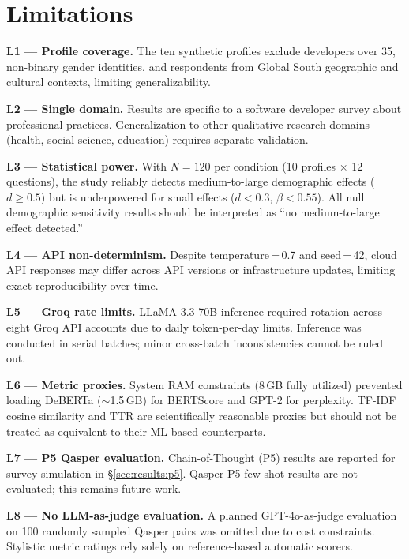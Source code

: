 \documentclass[sigconf,nonacm]{acmart}
\begin{document}
\section{Limitations}
\label{sec:limitations}

\textbf{L1 --- Profile coverage.}
The ten synthetic profiles exclude developers over 35, non-binary gender
identities, and respondents from Global South geographic and cultural
contexts, limiting generalizability.

\textbf{L2 --- Single domain.}
Results are specific to a software developer survey about professional
practices. Generalization to other qualitative research domains
(health, social science, education) requires separate validation.

\textbf{L3 --- Statistical power.}
With $N{=}120$ per condition (10 profiles $\times$ 12 questions), the
study reliably detects medium-to-large demographic effects ($d \geq 0.5$)
but is underpowered for small effects ($d < 0.3$, $\beta < 0.55$).
All null demographic sensitivity results should be interpreted as
``no medium-to-large effect detected.''

\textbf{L4 --- API non-determinism.}
Despite temperature\,=\,0.7 and seed\,=\,42, cloud API responses may
differ across API versions or infrastructure updates, limiting exact
reproducibility over time.

\textbf{L5 --- Groq rate limits.}
LLaMA-3.3-70B inference required rotation across eight Groq API accounts
due to daily token-per-day limits. Inference was conducted in serial
batches; minor cross-batch inconsistencies cannot be ruled out.

\textbf{L6 --- Metric proxies.}
System RAM constraints (8\,GB fully utilized) prevented loading DeBERTa
($\sim$1.5\,GB) for BERTScore and GPT-2 for perplexity. TF-IDF cosine
similarity and TTR are scientifically reasonable proxies but should not
be treated as equivalent to their ML-based counterparts.

\textbf{L7 --- P5 Qasper evaluation.}
Chain-of-Thought (P5) results are reported for survey simulation in
\S\ref{sec:results:p5}. Qasper P5 few-shot results are not evaluated;
this remains future work.

\textbf{L8 --- No LLM-as-judge evaluation.}
A planned GPT-4o-as-judge evaluation on 100 randomly sampled Qasper pairs
was omitted due to cost constraints. Stylistic metric ratings rely solely
on reference-based automatic scorers.
\end{document}
